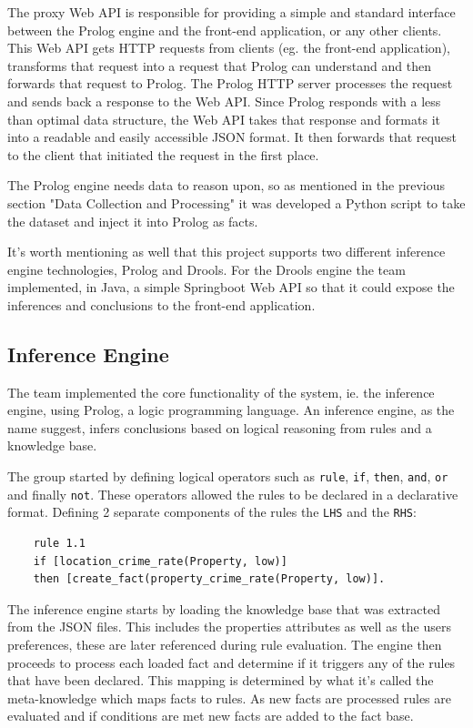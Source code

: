 \documentclass[runningheads]{llncs}
\begin{document}
The proxy Web API is responsible for providing a simple and standard interface between the Prolog engine and the front-end application, or any other clients. This Web API gets HTTP requests from clients (eg. the front-end application), transforms that request into a request that Prolog can understand and then forwards that request to Prolog. The Prolog HTTP server processes the request and sends back a response to the Web API. Since Prolog responds with a less than optimal data structure, the Web API takes that response and formats it into a readable and easily accessible JSON format. It then forwards that request to the client that initiated the request in the first place.

The Prolog engine needs data to reason upon, so as mentioned in the previous section "Data Collection and Processing" it was developed a Python script to take the dataset and inject it into Prolog as facts.

It's worth mentioning as well that this project supports two different inference engine technologies, Prolog and Drools. For the Drools engine the team implemented, in Java, a simple Springboot Web API so that it could expose the inferences and conclusions to the front-end application.

\subsection{Inference Engine}

The team implemented the core functionality of the system, ie. the inference engine, using Prolog, a logic programming language. An inference engine, as the name suggest, infers conclusions based on logical reasoning from rules and a knowledge base.

The group started by defining logical operators such as \texttt{rule}, \texttt{if}, \texttt{then}, \texttt{and}, \texttt{or} and finally \texttt{not}. These operators allowed the rules to be declared in a declarative format. Defining 2 separate components of the rules the \texttt{LHS} and the \texttt{RHS}:
\begin{verbatim}
    rule 1.1
    if [location_crime_rate(Property, low)]
    then [create_fact(property_crime_rate(Property, low)].
\end{verbatim}

The inference engine starts by loading the knowledge base that was extracted from the JSON files. This includes the properties attributes as well as the users preferences, these are later referenced during rule evaluation.
The engine then proceeds to process each loaded fact and determine if it triggers any of the rules that have been declared. This mapping is determined by what it's called the meta-knowledge which maps facts to rules. As new facts are processed rules are evaluated and if conditions are met new facts are added to the fact base.
\end{document}
